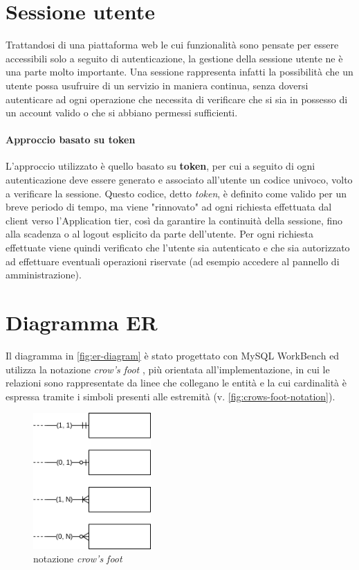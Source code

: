 \section{Sessione utente}
Trattandosi di una piattaforma web le cui funzionalità sono pensate per essere
accessibili solo a seguito di autenticazione, la gestione della sessione utente
ne è una parte molto importante. Una sessione rappresenta infatti la possibilità
che un utente possa usufruire di un servizio in maniera continua, senza doversi
autenticare ad ogni operazione che necessita di verificare che si sia in possesso
di un account valido o che si abbiano permessi sufficienti.

\paragraph{Approccio basato su token}
L'approccio utilizzato è quello basato su \textbf{token}, per cui a seguito
di ogni autenticazione deve essere generato e associato all'utente un codice
univoco, volto a verificare la sessione. Questo codice, detto \textit{token}, è
definito come valido per un breve periodo di tempo, ma viene "rinnovato" ad ogni
richiesta effettuata dal client verso l'Application tier, così da garantire la
continuità della sessione, fino alla scadenza o al logout esplicito da parte
dell'utente.
Per ogni richiesta effettuate viene quindi verificato che l'utente sia autenticato
e che sia autorizzato ad effettuare eventuali operazioni riservate (ad esempio
accedere al pannello di amministrazione).


\section{Diagramma ER}

Il diagramma in \autoref{fig:er-diagram} è stato progettato con MySQL WorkBench
\cite{workbench:9-EER} ed utilizza la notazione \textit{crow's foot}
\cite{wiki:crows-foot}, più orientata all'implementazione, in cui le relazioni
sono rappresentate da linee che collegano le entità e la cui cardinalità è
espressa tramite i simboli presenti alle estremità (v. \autoref{fig:crows-foot-notation}).

\begin{figure}[ht]
	\centering
	\includegraphics[width=0.4\textwidth]{assets/diagrams/crows-foot-notation.png}
	\cprotect\caption{notazione \textit{crow's foot}}
	\label{fig:crows-foot-notation}
\end{figure}


